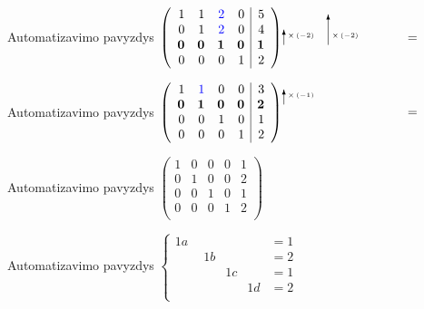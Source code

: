 \documentclass{beamer}
\begin{document}
\begin{frame}[fragile]{Automatizavimo pavyzdys}
\noindent$\left(\begin{array}{rrrr|r}
1 & 1 & \textcolor{blue}{2} & 0 & 5\\
0 & 1 & \textcolor{blue}{2} & 0 & 4\\
\bm{0} & \bm{0} & \bm{1} & \bm{0} & \bm{1}\\
0 & 0 & 0 & 1 & 2\\
\end{array}\right)
\setlength{\unitlength}{1pt}
\begin{picture} (95, 0)
\put(0.0, -3.0){\vector(0, 1){12}}
\put(3.0, 3.0){\tiny{$\times\left(-2\right)$}}
\put(35.0, -3.0){\vector(0, 1){24}}
\put(38.0, 3.0){\tiny{$\times\left(-2\right)$}}
\end{picture}=$
\end{frame}

\begin{frame}[fragile]{Automatizavimo pavyzdys}
\noindent$\left(\begin{array}{rrrr|r}
1 & \textcolor{blue}{1} & 0 & 0 & 3\\
\bm{0} & \bm{1} & \bm{0} & \bm{0} & \bm{2}\\
0 & 0 & 1 & 0 & 1\\
0 & 0 & 0 & 1 & 2\\
\end{array}\right)
\setlength{\unitlength}{1pt}
\begin{picture} (95, 0)
\put(0.0, 9.0){\vector(0, 1){12}}
\put(3.0, 15.0){\tiny{$\times\left(-1\right)$}}
\end{picture}=$
\end{frame}

\begin{frame}[fragile]{Automatizavimo pavyzdys}
\noindent$\left(\begin{array}{rrrr|r}
1 & 0 & 0 & 0 & 1\\
0 & 1 & 0 & 0 & 2\\
0 & 0 & 1 & 0 & 1\\
0 & 0 & 0 & 1 & 2\\
\end{array}\right)$
\end{frame}

\begin{frame}[fragile]{Automatizavimo pavyzdys}
$\left\{\begin{array}{lr}
1a  \phantom{+ 0b }  \phantom{+ 0c }   \phantom{+ 0d} &=1\\
\phantom{0a + }  1b  \phantom{+ 0c}  \phantom{+ 0d} &=2\\
\phantom{0a}  \phantom{+ 0b +}  1c  \phantom{+ 0d} &=1\\
\phantom{0a}  \phantom{+ 0b}  \phantom{+ 0c +} 1d &=2\\
\end{array}\right.$
\end{frame}
\end{document}

